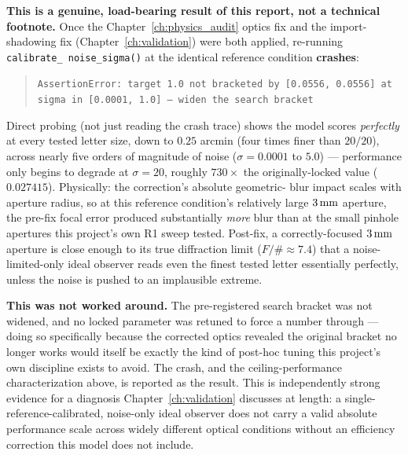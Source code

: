 \textbf{This is a genuine, load-bearing result of this report, not a technical
footnote.} Once the Chapter~\ref{ch:physics_audit} optics fix and the import-shadowing
fix (Chapter~\ref{ch:validation}) were both applied, re-running \texttt{calibrate\_
noise\_sigma()} at the identical reference condition \textbf{crashes}:
\begin{quote}
\texttt{AssertionError: target 1.0 not bracketed by [0.0556, 0.0556] at sigma in
[0.0001, 1.0] -- widen the search bracket}
\end{quote}
Direct probing (not just reading the crash trace) shows the model scores
\emph{perfectly} at every tested letter size, down to $0.25$ arcmin (four times finer
than $20/20$), across nearly five orders of magnitude of noise ($\sigma=0.0001$ to
$5.0$) --- performance only begins to degrade at $\sigma=20$, roughly $730\times$ the
originally-locked value ($0.027415$). Physically: the correction's absolute geometric-
blur impact scales with aperture radius, so at this reference condition's relatively
large $3\,\text{mm}$ aperture, the pre-fix focal error produced substantially \emph{more}
blur than at the small pinhole apertures this project's own R1 sweep tested. Post-fix,
a correctly-focused $3\,\text{mm}$ aperture is close enough to its true diffraction limit
($F/\#\approx7.4$) that a noise-limited-only ideal observer reads even the finest
tested letter essentially perfectly, unless the noise is pushed to an implausible
extreme.

\textbf{This was not worked around.} The pre-registered search bracket was not
widened, and no locked parameter was retuned to force a number through --- doing so
specifically because the corrected optics revealed the original bracket no longer
works would itself be exactly the kind of post-hoc tuning this project's own
discipline exists to avoid. The crash, and the ceiling-performance characterization
above, is reported as the result. This is independently strong evidence for a
diagnosis Chapter~\ref{ch:validation} discusses at length: a single-reference-calibrated,
noise-only ideal observer does not carry a valid absolute performance scale across
widely different optical conditions without an efficiency correction this model does
not include.
